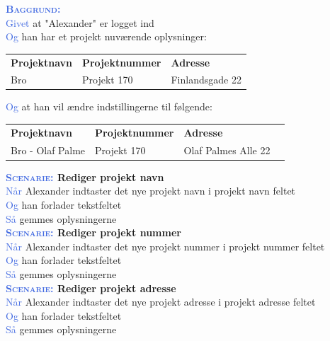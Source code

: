 \textsc{\textcolor{RoyalBlue}{\textbf{Baggrund:}}}\\
\textcolor{RoyalBlue}{Givet} at "Alexander" er logget ind\\
\textcolor{RoyalBlue}{Og} han har et projekt nuværende oplysninger:\\
\begin{tabular}{| l | l | l |}
	\textbf{Projektnavn} & \textbf{Projektnummer} & \textbf{Adresse} \\
	Bro & Projekt 170 & Finlandsgade 22 \\
\end{tabular}
\newline \newline
\textcolor{RoyalBlue}{Og} at han vil ændre indstillingerne til følgende:\\
\begin{tabular}{| l | l | l | l |}
	\textbf{Projektnavn} & \textbf{Projektnummer} & \textbf{Adresse} \\
	Bro - Olaf Palme & Projekt 170 & Olaf Palmes Alle 22 \\
\end{tabular}
\newline

\textbf{\textsc{\textcolor{RoyalBlue}{Scenarie:}} Rediger projekt navn}\\
\textcolor{RoyalBlue}{Når} Alexander indtaster det nye projekt navn i projekt navn feltet\\
\textcolor{RoyalBlue}{Og} han forlader tekstfeltet\\
\textcolor{RoyalBlue}{Så} gemmes oplysningerne\\

\textbf{\textsc{\textcolor{RoyalBlue}{Scenarie:}} Rediger projekt nummer}\\
\textcolor{RoyalBlue}{Når} Alexander indtaster det nye projekt nummer i projekt nummer feltet\\
\textcolor{RoyalBlue}{Og} han forlader tekstfeltet\\
\textcolor{RoyalBlue}{Så} gemmes oplysningerne\\

\textbf{\textsc{\textcolor{RoyalBlue}{Scenarie:}} Rediger projekt adresse}\\
\textcolor{RoyalBlue}{Når} Alexander indtaster det nye projekt adresse i projekt adresse feltet\\
\textcolor{RoyalBlue}{Og} han forlader tekstfeltet\\
\textcolor{RoyalBlue}{Så} gemmes oplysningerne\\

